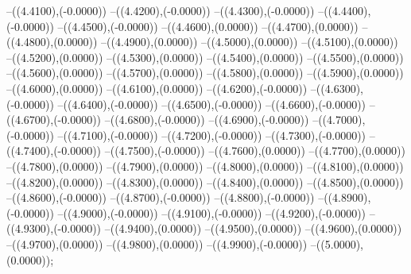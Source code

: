 {	--({\sx*(4.4100)},{\sy*(-0.0000)})
	--({\sx*(4.4200)},{\sy*(-0.0000)})
	--({\sx*(4.4300)},{\sy*(-0.0000)})
	--({\sx*(4.4400)},{\sy*(-0.0000)})
	--({\sx*(4.4500)},{\sy*(-0.0000)})
	--({\sx*(4.4600)},{\sy*(0.0000)})
	--({\sx*(4.4700)},{\sy*(0.0000)})
	--({\sx*(4.4800)},{\sy*(0.0000)})
	--({\sx*(4.4900)},{\sy*(0.0000)})
	--({\sx*(4.5000)},{\sy*(0.0000)})
	--({\sx*(4.5100)},{\sy*(0.0000)})
	--({\sx*(4.5200)},{\sy*(0.0000)})
	--({\sx*(4.5300)},{\sy*(0.0000)})
	--({\sx*(4.5400)},{\sy*(0.0000)})
	--({\sx*(4.5500)},{\sy*(0.0000)})
	--({\sx*(4.5600)},{\sy*(0.0000)})
	--({\sx*(4.5700)},{\sy*(0.0000)})
	--({\sx*(4.5800)},{\sy*(0.0000)})
	--({\sx*(4.5900)},{\sy*(0.0000)})
	--({\sx*(4.6000)},{\sy*(0.0000)})
	--({\sx*(4.6100)},{\sy*(0.0000)})
	--({\sx*(4.6200)},{\sy*(-0.0000)})
	--({\sx*(4.6300)},{\sy*(-0.0000)})
	--({\sx*(4.6400)},{\sy*(-0.0000)})
	--({\sx*(4.6500)},{\sy*(-0.0000)})
	--({\sx*(4.6600)},{\sy*(-0.0000)})
	--({\sx*(4.6700)},{\sy*(-0.0000)})
	--({\sx*(4.6800)},{\sy*(-0.0000)})
	--({\sx*(4.6900)},{\sy*(-0.0000)})
	--({\sx*(4.7000)},{\sy*(-0.0000)})
	--({\sx*(4.7100)},{\sy*(-0.0000)})
	--({\sx*(4.7200)},{\sy*(-0.0000)})
	--({\sx*(4.7300)},{\sy*(-0.0000)})
	--({\sx*(4.7400)},{\sy*(-0.0000)})
	--({\sx*(4.7500)},{\sy*(-0.0000)})
	--({\sx*(4.7600)},{\sy*(0.0000)})
	--({\sx*(4.7700)},{\sy*(0.0000)})
	--({\sx*(4.7800)},{\sy*(0.0000)})
	--({\sx*(4.7900)},{\sy*(0.0000)})
	--({\sx*(4.8000)},{\sy*(0.0000)})
	--({\sx*(4.8100)},{\sy*(0.0000)})
	--({\sx*(4.8200)},{\sy*(0.0000)})
	--({\sx*(4.8300)},{\sy*(0.0000)})
	--({\sx*(4.8400)},{\sy*(0.0000)})
	--({\sx*(4.8500)},{\sy*(0.0000)})
	--({\sx*(4.8600)},{\sy*(-0.0000)})
	--({\sx*(4.8700)},{\sy*(-0.0000)})
	--({\sx*(4.8800)},{\sy*(-0.0000)})
	--({\sx*(4.8900)},{\sy*(-0.0000)})
	--({\sx*(4.9000)},{\sy*(-0.0000)})
	--({\sx*(4.9100)},{\sy*(-0.0000)})
	--({\sx*(4.9200)},{\sy*(-0.0000)})
	--({\sx*(4.9300)},{\sy*(-0.0000)})
	--({\sx*(4.9400)},{\sy*(0.0000)})
	--({\sx*(4.9500)},{\sy*(0.0000)})
	--({\sx*(4.9600)},{\sy*(0.0000)})
	--({\sx*(4.9700)},{\sy*(0.0000)})
	--({\sx*(4.9800)},{\sy*(0.0000)})
	--({\sx*(4.9900)},{\sy*(-0.0000)})
	--({\sx*(5.0000)},{\sy*(0.0000)});
}
